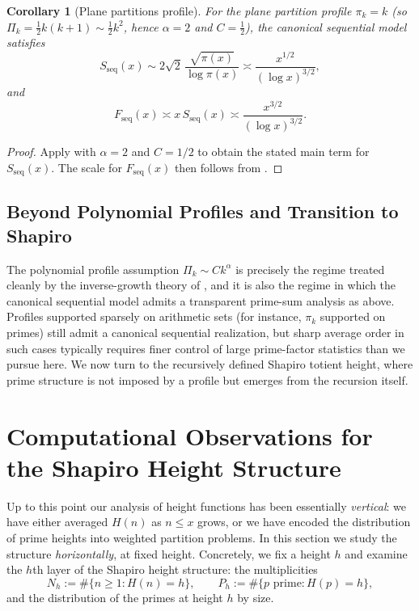 \documentclass[11pt]{article}
\newtheorem{corollary}{Corollary}
\theoremstyle{definition}
\begin{document}
\begin{corollary}[Plane partitions profile]\label{cor:seq-plane-partitions}
For the plane partition profile $\pi_k=k$ (so $\Pi_k=\tfrac12k(k+1)\sim \tfrac12 k^2$, hence
$\alpha=2$ and $C=\tfrac12$), the canonical sequential model satisfies
\[
S_{\mathrm{seq}}(x)\sim 2\sqrt{2}\,\frac{\sqrt{\pi(x)}}{\log \pi(x)}
\asymp \frac{x^{1/2}}{(\log x)^{3/2}},
\]
and
\[
F_{\mathrm{seq}}(x)\asymp x\,S_{\mathrm{seq}}(x)\asymp \frac{x^{3/2}}{(\log x)^{3/2}}.
\]
\end{corollary}

\begin{proof}
Apply  with $\alpha=2$ and $C=1/2$ to obtain the stated main term for
$S_{\mathrm{seq}}(x)$.  The scale for $F_{\mathrm{seq}}(x)$ then follows from
.
\end{proof}

\subsection{Beyond Polynomial Profiles and Transition to Shapiro}
The polynomial profile assumption $\Pi_k\sim Ck^\alpha$ is precisely the regime treated cleanly by the
inverse-growth theory of , and it is also the regime in which the canonical sequential model
admits a transparent prime-sum analysis as above.  Profiles supported sparsely on arithmetic sets (for
instance, $\pi_k$ supported on primes) still admit a canonical sequential realization, but sharp average
order in such cases typically requires finer control of large prime-factor statistics than we pursue here.
We now turn to the recursively defined Shapiro totient height, where prime structure is not imposed by a
profile but emerges from the recursion itself.

\section{Computational Observations for the Shapiro Height Structure}
\label{sec8}

Up to this point our analysis of height functions has been essentially
\emph{vertical}: we have either averaged $H(n)$ as $n\le x$ grows, or we have
encoded the distribution of prime heights into weighted partition problems.
In this section we study the structure \emph{horizontally}, at fixed height.
Concretely, we fix a height $h$ and examine the $h$th layer of the Shapiro
height structure: the multiplicities
\[
  N_h := \#\{n\ge1 : H(n)=h\},\qquad
  P_h := \#\{p\text{ prime} : H(p)=h\},
\]
and the distribution of the primes at height $h$ by size.
\end{document}
